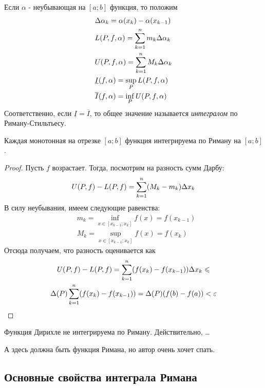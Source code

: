\begin{definition}
	Если $\alpha$ - неубывающая на $[a; b]$ функция, то положим
	\begin{align*}
		&{\Delta \alpha_k = \alpha(x_k) - \alpha(x_{k - 1})}
		\\
		&{L(P, f, \alpha) = \sum\limits_{k = 1}^n m_k \Delta \alpha_k}
		\\
		&{U(P, f, \alpha) = \sum\limits_{k = 1}^n M_k \Delta \alpha_k}
		\\
		&{\underline{I}(f, \alpha) = \sup\limits_P L(P, f, \alpha)}
		\\
		&{\overline{I}(f, \alpha) = \inf\limits_P U(P, f, \alpha)}
	\end{align*}
	Соответственно, если $\underline{I} = \overline{I}$, то общее значение называется \textit{интегралом} по Риману-Стильтьесу.
\end{definition}

\begin{theorem}
	Каждая монотонная на отрезке $[a; b]$ функция интегрируема по Риману на $[a; b]$.
\end{theorem}

\begin{proof}
	Пусть $f$ возрастает. Тогда, посмотрим на разность сумм Дарбу:
	\[
		U(P, f) - L(P, f) = \sum\limits_{k = 1}^n (M_k - m_k) \Delta x_k
	\]
	В силу неубывания, имеем следующие равенства:
	\begin{align*}
		&{m_k = \inf\limits_{x \in [x_{k - 1}; x_k]} f(x) = f(x_{k - 1})}
		\\
		&{M_k = \sup\limits_{x \in [x_{k - 1}; x_k]} f(x) = f(x_k)}
	\end{align*}
	Отсюда получаем, что разность оценивается как
	\begin{multline*}
		U(P, f) - L(P, f) = \sum\limits_{k = 1}^n (f(x_k) - f(x_{k - 1})) \Delta x_k \leqslant
		\\
		\Delta(P) \sum\limits_{k = 1}^n (f(x_k) - f(x_{k - 1})) = \Delta(P)(f(b) - f(a)) < \varepsilon
	\end{multline*}
\end{proof}

\begin{example}
	Функция Дирихле не интегрируема по Риману. Действительно, \ldots
\end{example}

\begin{example}
	А здесь должна быть функция Римана, но автор очень хочет спать.
\end{example}

\subsection{Основные свойства интеграла Римана}

